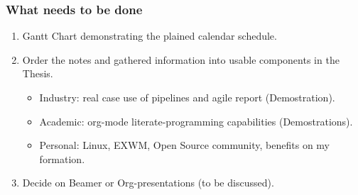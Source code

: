\documentclass[11pt]{article}
\begin{document}
\subsubsection{What needs to be done}
\label{sec:orgc0627db}
\begin{enumerate}
\item Gantt Chart demonstrating the plained calendar schedule.
\item Order the notes and gathered information into usable components
in the Thesis.
\begin{itemize}
\item Industry: real case use of pipelines and agile report (Demostration).
\item Academic: org-mode literate-programming capabilities
(Demostrations).
\item Personal: Linux, EXWM, Open Source community, benefits on my formation.
\end{itemize}
\item Decide on Beamer or Org-presentations (to be discussed).
\end{enumerate}
\end{document}
